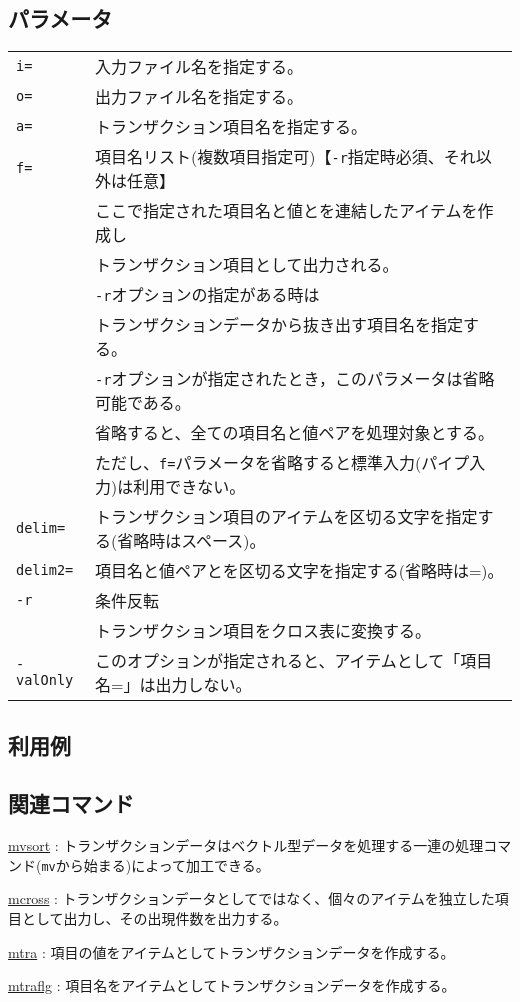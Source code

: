 \subsection*{パラメータ}
\begin{table}[htbp]
{\small
\begin{tabular}{ll}
\verb|i=|    & 入力ファイル名を指定する。\\
\verb|o=|    & 出力ファイル名を指定する。\\
\verb|a=|      & トランザクション項目名を指定する。\\
\verb|f=|      & 項目名リスト(複数項目指定可)【\verb|-r|指定時必須、それ以外は任意】\\
               & ここで指定された項目名と値とを連結したアイテムを作成し\\
               & トランザクション項目として出力される。\\
               & \verb|-r|オプションの指定がある時は\\
               & トランザクションデータから抜き出す項目名を指定する。\\
               & \verb|-r|オプションが指定されたとき，このパラメータは省略可能である。\\
               & 省略すると、全ての項目名と値ペアを処理対象とする。\\
               & ただし、\verb|f=|パラメータを省略すると標準入力(パイプ入力)は利用できない。\\
\verb|delim=|  & トランザクション項目のアイテムを区切る文字を指定する(省略時はスペース)。\\
\verb|delim2=| & 項目名と値ペアとを区切る文字を指定する(省略時は=)。\\
\verb|-r|      & 条件反転\\
               & トランザクション項目をクロス表に変換する。\\
\verb|-valOnly|& このオプションが指定されると、アイテムとして「項目名=」は出力しない。\\
\end{tabular} 
}
\end{table} 

\subsection*{利用例}

\subsection*{関連コマンド}
\hyperref[sect:mvsort] {mvsort} : トランザクションデータはベクトル型データを処理する一連の処理コマンド(\verb|mv|から始まる)によって加工できる。

\hyperref[sect:mcross] {mcross} : トランザクションデータとしてではなく、個々のアイテムを独立した項目として出力し、その出現件数を出力する。

\hyperref[sect:mtra] {mtra} : 項目の値をアイテムとしてトランザクションデータを作成する。

\hyperref[sect:mtraflg] {mtraflg} : 項目名をアイテムとしてトランザクションデータを作成する。

%
